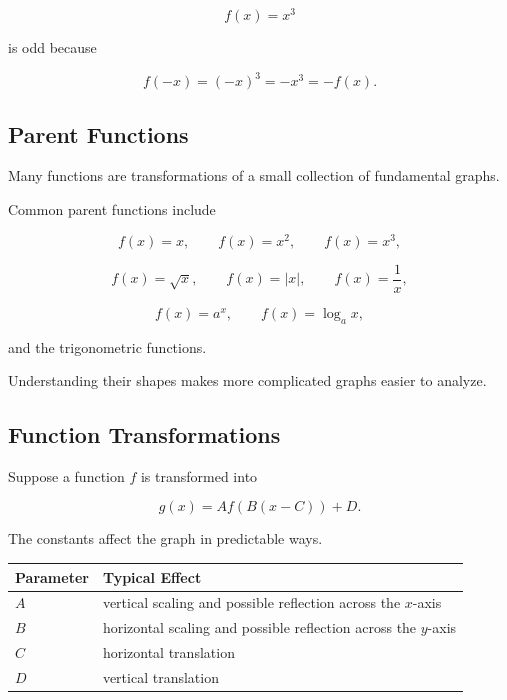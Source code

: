\[ f(x)=x^3 \]

is odd because

\[ f(-x)=(-x)^3=-x^3=-f(x). \]

\subsection{Parent Functions}
\label{subsec:parent-functions}

Many functions are transformations of a small collection of fundamental
graphs.

Common parent functions include

\[
f(x)=x,\qquad
f(x)=x^2,\qquad
f(x)=x^3,
\]

\[
f(x)=\sqrt{x},\qquad
f(x)=|x|,\qquad
f(x)=\frac1x,
\]

\[
f(x)=a^x,\qquad
f(x)=\log_a x,
\]

and the trigonometric functions.

Understanding their shapes makes more complicated graphs easier to analyze.

\subsection{Function Transformations}
\label{subsec:function-transformations}

Suppose a function \(f\) is transformed into

\[ g(x)=Af(B(x-C))+D. \]

The constants affect the graph in predictable ways.

\begin{center}
\begin{tabularx}{0.9\textwidth}{@{}lX@{}}
\toprule
\textbf{Parameter} & \textbf{Typical Effect}\\
\midrule
\(A\) & vertical scaling and possible reflection across the \(x\)-axis\\
\(B\) & horizontal scaling and possible reflection across the \(y\)-axis\\
\(C\) & horizontal translation\\
\(D\) & vertical translation\\
\bottomrule
\end{tabularx}
\end{center}

